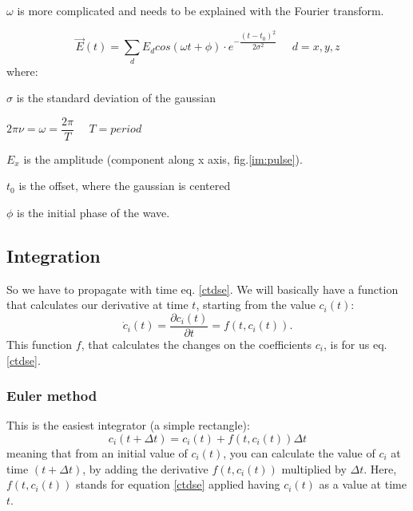 $\omega$ is more complicated and needs to be explained with the Fourier transform.

\begin{equation}\label{pulse}
\vec{E}(t) = \sum_d E_d cos(\omega t + \phi)\cdot e^{-\dfrac{(t-t_0)^2}{2\sigma^2}} \ \ \ \ \ \   d={x,y,z}
\end{equation}
where:
\bee
\item $\sigma$ is the standard deviation of the gaussian
\item $2\pi \nu = \omega = \dfrac{2\pi}{T}   \ \ \ \ \ \    T = period$
\item $E_x$ is the amplitude (component along x axis, fig.\ref{im:pulse}).
\item $t_0$ is the offset, where the gaussian is centered
\item $\phi$ is the initial phase of the wave.
\ee


\subsection{Integration}
So we have to propagate with time eq. \ref{ctdse}. We will basically have a function that calculates our derivative at time $t$, starting from the value $c_i(t)$: $$\dot{c}_i(t)=\dfrac{\partial c_i(t)}{\partial t}=f(t,c_i(t)).$$ This function $f$, that calculates the changes on the coefficients $c_i$, is for us eq. \ref{ctdse}.
\subsubsection{Euler method}
This is the easiest integrator (a simple rectangle):
\begin{equation}
c_i (t + \Delta t) = c_i(t) + f(t,c_i(t)) \Delta t 
\end{equation}
meaning that from an initial value of $c_i(t)$, you can calculate the value of $c_i$ at time $(t + \Delta t)$, by adding the derivative $f(t,c_i(t))$ multiplied by $\Delta t$. Here, $f(t,c_i(t))$ stands for equation \ref{ctdse} applied having $c_i(t)$ as a value at time $t$. 
